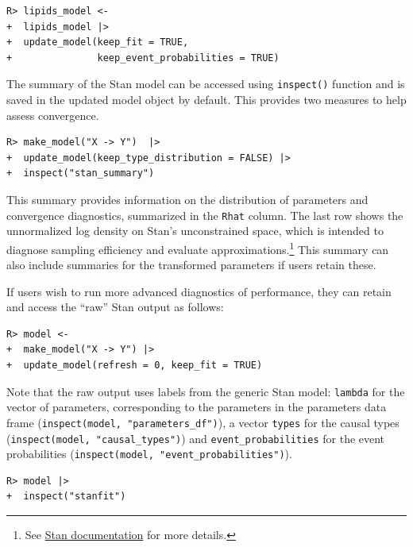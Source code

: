 \documentclass[
  11pt,
  article]{jss}
\begin{document}
\begin{verbatim}
R> lipids_model <- 
+  lipids_model |> 
+  update_model(keep_fit = TRUE,
+               keep_event_probabilities = TRUE)
\end{verbatim}

The summary of the Stan model can be accessed using \texttt{inspect()}
function and is saved in the updated model object by default. This
provides two measures to help assess convergence.

\begin{verbatim}
R> make_model("X -> Y")  |> 
+  update_model(keep_type_distribution = FALSE) |>
+  inspect("stan_summary") 
\end{verbatim}

This summary provides information on the distribution of parameters and
convergence diagnostics, summarized in the \texttt{Rhat} column. The
last row shows the unnormalized log density on Stan's unconstrained
space, which is intended to diagnose sampling efficiency and evaluate
approximations.\footnote{See
  \href{https://mc-stan.org/cmdstanr/reference/fit-method-lp.html}{Stan
  documentation} for more details.} This summary can also include
summaries for the transformed parameters if users retain these.

If users wish to run more advanced diagnostics of performance, they can
retain and access the ``raw'' Stan output as follows:

\begin{verbatim}
R> model <- 
+  make_model("X -> Y") |> 
+  update_model(refresh = 0, keep_fit = TRUE)
\end{verbatim}

Note that the raw output uses labels from the generic Stan model:
\texttt{lambda} for the vector of parameters, corresponding to the
parameters in the parameters data frame
(\texttt{inspect(model,\ "parameters\_df")}), a vector \texttt{types}
for the causal types (\texttt{inspect(model,\ "causal\_types")}) and
\texttt{event\_probabilities} for the event probabilities
(\texttt{inspect(model,\ "event\_probabilities")}).

\begin{verbatim}
R> model |> 
+  inspect("stanfit")
\end{verbatim}
\end{document}
